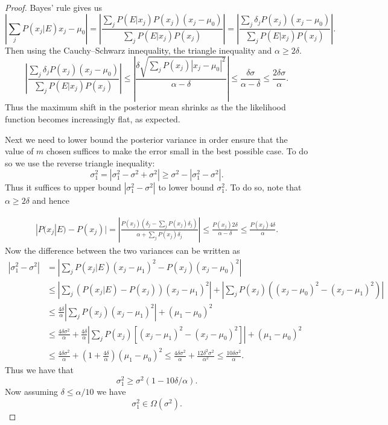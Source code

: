 \documentclass[aps,pra,amsmath,twocolumn,amssymb,superscriptaddress]{revtex4-1}
\begin{document}
\begin{proof}
Bayes' rule gives us
\begin{equation}
\left|\sum_j P(x_j|E) x_j -\mu_0\right|= \left|\frac{\sum_j P(E|x_j)P(x_j) (x_j -\mu_0)}{\sum_j P(E|x_j)P(x_j)}\right|=\left|\frac{\sum_j \delta_j P(x_j)(x_j -\mu_0)}{\sum_j P(E|x_j)P(x_j)}\right|.\label{eq:A1}
\end{equation}
Then using the Cauchy--Schwarz innequality, the triangle inequality and $\alpha\ge 2\delta$.
\begin{equation}
\left|\frac{\sum_j \delta_jP(x_j )( x_j -\mu_0)}{\sum_j P(E|x_j)P(x_j)}\right| \le \left|\frac{\delta \sqrt{\sum_j P(x_j) |x_j -\mu_0|^2}}{\alpha-\delta}\right|\le \frac{\delta  \sigma}{\alpha-\delta}\le \frac{2\delta{\sigma}}{\alpha}.\label{eq:A2}
\end{equation}
Thus the maximum shift in the posterior mean shrinks as the the likelihood function becomes increasingly flat, as expected.

Next we need to lower bound the posterior variance in order ensure that the value of $m$ chosen suffices to make the error small in the best possible case.
To do so we use the reverse triangle inequality:
\begin{equation}
\sigma_1^2 = |\sigma_1^2 -\sigma^2 +\sigma^2| \ge \sigma^2 - |\sigma_1^2-\sigma^2|.
\end{equation}
Thus it suffices to upper bound $|\sigma_1^2-\sigma^2|$ to lower bound $\sigma_1^2$.  To do so, note that $\alpha \ge 2\delta$ and hence

\begin{align}
|P(x_j|E)-P(x_j)| = \left|\frac{P(x_j)(\delta_j-\sum_jP(x_j)\delta_j)}{\alpha+\sum_j P(x_j)\delta_j}\right|\le \frac{P(x_j) 2\delta}{\alpha-\delta}\le \frac{P(x_j) 4\delta}{\alpha}.
\end{align}
Now the difference between the two variances can be written as
\begin{align}
|\sigma_1^2-\sigma^2| &= \left|\sum_j  P(x_j|E)(x_j-\mu_1)^2-P(x_j)(x_j-\mu_0)^2\right|\nonumber\\
 &\le \left|\sum_j  (P(x_j|E)-P(x_j))(x_j-\mu_1)^2\right|+\left|\sum_j P(x_j)\left((x_j-\mu_0)^2-(x_j-\mu_1)^2\right)\right|\nonumber\\
 &\le  \frac{4\delta}{\alpha}\left|\sum_j  P(x_j)(x_j-\mu_1)^2\right|+(\mu_1-\mu_0)^2\nonumber\\
&\le \frac{4\delta\sigma^2}{\alpha}+\frac{4\delta}{\alpha}\left|\sum_j P(x_j)[(x_j-\mu_1)^2-(x_j-\mu_0)^2]  \right|+(\mu_1-\mu_0)^2\nonumber\\
&\le \frac{4\delta\sigma^2}{\alpha}+(1+\frac{4\delta}{\alpha})(\mu_1-\mu_0)^2\le \frac{4\delta\sigma^2}{\alpha}+ \frac{12\delta^2\sigma^2}{\alpha^2}\le \frac{10\delta\sigma^2}{\alpha}.
\end{align}
Thus we have that
\begin{equation}
\sigma_1^2 \ge \sigma^2(1-10\delta/\alpha).
\end{equation}
Now assuming $\delta\le \alpha/10$ we have 
\begin{equation}
\sigma_1^2\in \Omega(\sigma^2).
\end{equation}


\end{proof}
\end{document}
